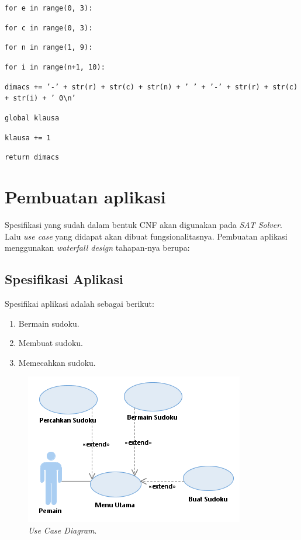 \begin{enumerate}
	\qquad \qquad\texttt{for e in range(0, 3):}
	
	\qquad \qquad \qquad\texttt{for c in range(0, 3):}
	
	\qquad \qquad \qquad \qquad\texttt{for n in range(1, 9):}
	
	\qquad\qquad\qquad\qquad\qquad\texttt{for i in range(n+1, 10):}
	
	\qquad\qquad\qquad\qquad\qquad\qquad\texttt{dimacs += '-' + str(r) + str(c) + str(n) + ' ' + '-' + str(r) + str(c) + str(i) + ' 0\textbackslash n'}
	
	\qquad\qquad\qquad\qquad\qquad\texttt{global klausa}
	
	\qquad\qquad\qquad\qquad\qquad\texttt{klausa += 1}
	
	\qquad \qquad\texttt{return dimacs}
	
\end{enumerate}

\section{Pembuatan aplikasi}

Spesifikasi yang sudah dalam bentuk CNF akan digunakan pada \textit{SAT Solver}. Lalu \textit{use case} yang didapat akan dibuat fungsionalitasnya. Pembuatan aplikasi menggunakan \textit{waterfall design} tahapan-nya berupa:

\subsection{Spesifikasi Aplikasi}

Spesifikai aplikasi adalah sebagai berikut:
\begin{enumerate}
	\item Bermain sudoku.
	\item Membuat sudoku.
	\item Memecahkan sudoku.
\end{enumerate}

\begin{figure}[H]
	\begin{centering}
		\includegraphics[scale=1]{gambar/useCase}
		
		\caption{\textit{Use Case Diagram}.}
	\end{centering}
\end{figure}

